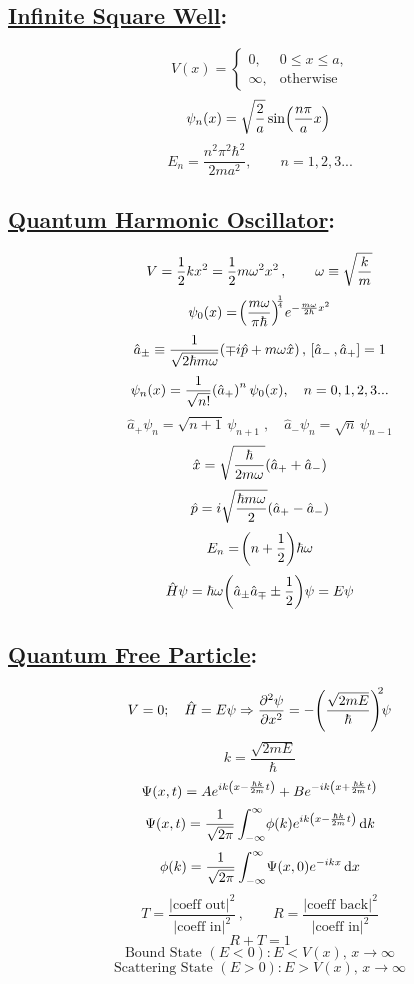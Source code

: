 \documentclass[fleqn]{article}
\begin{document}
\begin{multicols*}{3}


\subsection*{ \centering \underline{Infinite Square Well}:}
\[ V(x) = \left\{ \begin{array}{ll} 0, & \mbox{$0 \leq x \leq a$,}\\ \infty, & \mbox{otherwise}\end{array} \right. \]
\[\psi_{n}(x) = \sqrt{\frac{2}{a}}\sin\!\left({\frac{n\pi}{a}x}\right)\,\]
\[E_{n} = \frac{n^2\pi^2\hbar^2}{2ma^2},\qquad n=1,2,3...\]
             
             
\subsection*{ \centering \underline{Quantum Harmonic Oscillator}:}
\[V = \frac{1}{2} kx^2 =\frac{1}{2} m\omega^2x^2\,,\qquad \omega \equiv \sqrt{\frac{k}{m}}\]
\[\psi_{0}(x) = {\!\left({\frac{m\omega}{\pi\hbar}}\right)}^{\!\!\frac{1}{4}} e^{-\frac{m\omega}{2\hbar}x^2}\] 
\[\hat{a}_{\pm} \equiv \frac{1}{\sqrt{2\hbar m\omega}}\!\left({\mp i\hat{p} + m\omega \hat{x}}\right),\, \left[ \hat{a}_-\, , \hat{a}_+\right]=1\]
\[\psi_{n}(x) = \frac{1}{\sqrt{n!}}\!\left({\hat{a}_{+}}\right)^{n}\psi_{0}(x),\quad n=0,1,2,3...\]
\[\hat{a}_{+}\psi_{n} = \sqrt{n+1}\,\psi_{n+1}\; ,\quad \hat{a}_{-}\psi_{n} = \sqrt{n}\,\psi_{n-1}\]
\[\hat{x} = \sqrt{\frac{\hbar}{2m\omega}}\!\left({\hat{a}_{+} + \hat{a}_{-}}\right)\]
\[ \hat{p} = i\sqrt{\frac{\hbar m\omega}{2}}\!\left({\hat{a}_{+} - \hat{a}_{-}}\right)\]
\[E_n = \!\left({n +\frac{1}{2} }\right)\!\hbar\omega\]
\[\hat{H}\psi = \hbar\omega\!\left({\hat{a}_{\pm}\hat{a}_{\mp} \pm \frac{1}{2}}\right)\!\psi = E\psi\]

\subsection*{ \centering \underline{Quantum Free Particle}:}
\[V = 0;\quad \hat{H}= E\psi \Rightarrow \frac{\partial^{2}\!{\,\psi}}{\partial{x}^{2} } = -\!\left({\frac{\sqrt{2mE}}{\hbar}}\right)^{\!\!2}\!\!\psi\]
\[k = \frac{\sqrt{2mE}}{\hbar}\]
\[ \Psi(x,t) = Ae^{ik\,\!\left({x-\frac{\hbar k}{2m}t}\right)} + Be^{-ik\,\!\left({x+\frac{\hbar k}{2m}t}\right)}\]
\[\Psi(x,t) = \frac{1}{\sqrt{2\pi}}\int_{-\infty}^{\infty} \! \phi(k)e^{ik\,\!\left({x-\frac{\hbar k}{2m}t}\right)} \, \mathrm{d} k\]
\[\phi(k) = \frac{1}{\sqrt{2\pi}}\int_{-\infty}^{\infty} \! \Psi(x,0)e^{-ikx} \, \mathrm{d} x\]
\[T = \frac{\vert \mbox{coeff out}\vert^2}{\vert\mbox{coeff in}\vert^2}\, ,\qquad R = \frac{\vert \mbox{coeff back}\vert^2}{\vert\mbox{coeff in}\vert^2}\]
\[R + T = 1\]
\[\mbox{Bound State }(E<0)\!: E<V(x)\mbox{, }x\rightarrow\infty\]
\[\mbox{Scattering State }(E>0)\!: E>V(x)\mbox{, }x\rightarrow\infty\]


\end{multicols*}
\end{document}

